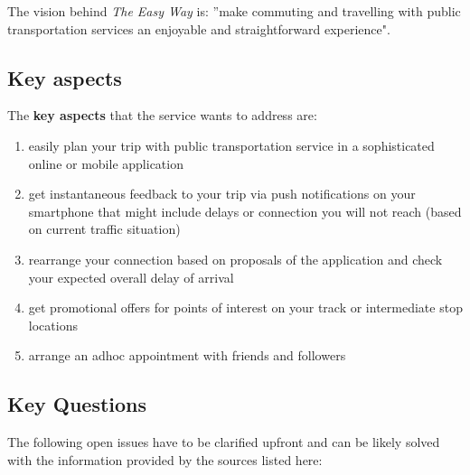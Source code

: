 \documentclass[a4paper]{article}
\begin{document}
The vision behind \textit{The Easy Way} is: ''make commuting and travelling with public transportation services an enjoyable and straightforward experience".

\subsection{Key aspects}
\label{subsec:aspects}

The \textbf{key aspects} that the service wants to address are:

\begin{enumerate}
\item easily plan your trip with public transportation service in a sophisticated online or mobile application
\item  get instantaneous feedback to your trip via push notifications on your smartphone that might include delays or connection you will not reach (based on current traffic situation)
\item  rearrange your connection based on proposals of the application and check your expected overall delay of arrival
\item  get promotional offers for points of interest on your track or intermediate stop locations
\item  arrange an ad­hoc appointment with friends and followers
\end{enumerate}

\subsection{Key Questions}
\label{subsec:questions}

The following open issues have to be clarified upfront and can be likely solved with the information provided by the sources listed here:
\end{document}
